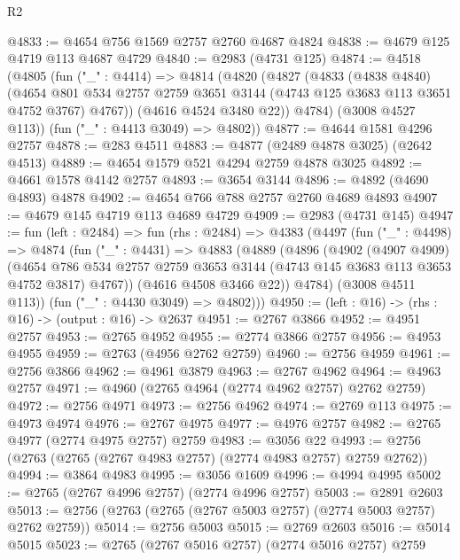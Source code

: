 \begin{lexlean}{R2}
\begin{coremodule}
@4833 := @4654 @756 @1569 @2757 @2760 @4687 @4824
@4838 := @4679 @125 @4719 @113 @4687 @4729
@4840 := @2983 (@4731 @125)
@4874 := @4518
    (@4805
      (fun ("_" : @4414) =>
      @4814
        (@4820
          (@4827
            (@4833
              (@4838 @4840)
              (@4654
                @801
                @534
                @2757
                @2759
                @3651
                @3144
                (@4743 @125 @3683 @113 @3651 @4752 @3767)
                @4767))
            (@4616 @4524 @3480 @22))
          @4784)
        (@3008 @4527 @113))
      (fun ("_" : @4413 @3049) => @4802))
@4877 := @4644 @1581 @4296 @2757
@4878 := @283 @4511
@4883 := @4877 (@2489 @4878 @3025) (@2642 @4513)
@4889 := @4654 @1579 @521 @4294 @2759 @4878 @3025
@4892 := @4661 @1578 @4142 @2757
@4893 := @3654 @3144
@4896 := @4892 (@4690 @4893) @4878
@4902 := @4654 @766 @788 @2757 @2760 @4689 @4893
@4907 := @4679 @145 @4719 @113 @4689 @4729
@4909 := @2983 (@4731 @145)
@4947 := fun (left : @2484) =>
  fun (rhs : @2484) =>
  @4383
    (@4497
      (fun ("_" : @4498) =>
      @4874
        (fun ("_" : @4431) =>
        @4883
          (@4889
            (@4896
              (@4902
                (@4907 @4909)
                (@4654
                  @786
                  @534
                  @2757
                  @2759
                  @3653
                  @3144
                  (@4743 @145 @3683 @113 @3653 @4752 @3817)
                  @4767))
              (@4616 @4508 @3466 @22))
            @4784)
          (@3008 @4511 @113))
        (fun ("_" : @4430 @3049) => @4802)))
@4950 := (left : @16) -> (rhs : @16) -> (output : @16) -> @2637
@4951 := @2767 @3866
@4952 := @4951 @2757
@4953 := @2765 @4952
@4955 := @2774 @3866 @2757
@4956 := @4953 @4955
@4959 := @2763 (@4956 @2762 @2759)
@4960 := @2756 @4959
@4961 := @2756 @3866
@4962 := @4961 @3879
@4963 := @2767 @4962
@4964 := @4963 @2757
@4971 := @4960 (@2765 @4964 (@2774 @4962 @2757) @2762 @2759)
@4972 := @2756 @4971
@4973 := @2756 @4962
@4974 := @2769 @113
@4975 := @4973 @4974
@4976 := @2767 @4975
@4977 := @4976 @2757
@4982 := @2765 @4977 (@2774 @4975 @2757) @2759
@4983 := @3056 @22
@4993 := @2756 (@2763 (@2765 (@2767 @4983 @2757) (@2774 @4983 @2757) @2759 @2762))
@4994 := @3864 @4983
@4995 := @3056 @1609
@4996 := @4994 @4995
@5002 := @2765 (@2767 @4996 @2757) (@2774 @4996 @2757)
@5003 := @2891 @2603
@5013 := @2756 (@2763 (@2765 (@2767 @5003 @2757) (@2774 @5003 @2757) @2762 @2759))
@5014 := @2756 @5003
@5015 := @2769 @2603
@5016 := @5014 @5015
@5023 := @2765 (@2767 @5016 @2757) (@2774 @5016 @2757) @2759

\end{coremodule}
\end{lexlean}
